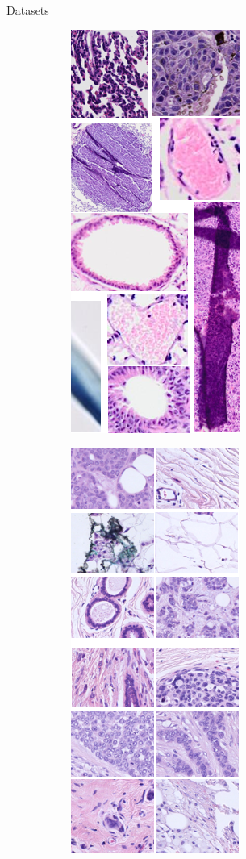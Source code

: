 \documentclass{beamer}
\begin{document}
\begin{frame}{Datasets}
\begin{figure}
    \begin{subfigure}{0.1\textwidth}\includegraphics[scale=0.35]{images/illus_tissus.png}\end{subfigure}
    \begin{subfigure}{0.1\textwidth}\includegraphics[scale=0.35]{images/illus_breast.png}\end{subfigure}

\end{figure}
\end{frame}
\end{document}
